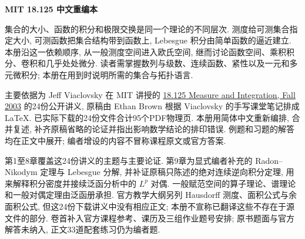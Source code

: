 \frontmatter
\begin{center}
{\color{structurecolor}\bfseries\fontsize{18}{25}\selectfont\BookTitle\par}
{\bfseries MIT 18.125 中文重编本\par}
\BookAuthor\par
\BookDate\par
\end{center}
\originalpreface
集合的大小、函数的积分和极限交换是同一个理论的不同层次. 测度给可测集合指定大小, 可测函数把集合结构带到函数上, Lebesgue 积分由简单函数的逼近建立. 本册沿这一依赖顺序, 从一般测度空间进入欧氏空间, 继而讨论函数空间、乘积积分、卷积和几乎处处微分. 读者需掌握数列与级数、连续函数、紧性以及一元和多元微积分; 本册在用到时说明所需的集合与拓扑语言.

主要依据为 Jeff Viaclovsky 在 MIT 讲授的 \href{https://ocw.mit.edu/courses/18-125-measure-and-integration-fall-2003/pages/lecture-notes/}{18.125 Measure and Integration, Fall 2003} 的24份公开讲义, 原稿由 Ethan Brown 根据 Viaclovsky 的手写课堂笔记排成 LaTeX. 已实际下载的24份文件合计95个PDF物理页. 本册用简体中文重新编排, 合并复述, 补齐原稿省略的论证并指出影响数学结论的排印错误. 例题和习题的解答均在正文中展开; 编者增设的内容不冒称课程原文或官方答案.

第1至8章覆盖这24份讲义的主题与主要论证. 第9章为显式编者补充的 Radon--Nikodym 定理与 Lebesgue 分解, 并补证原稿只陈述的绝对连续逆向积分定理, 用来解释积分密度并接续泛函分析中的 $L^p$ 对偶. 一般赋范空间的算子理论、谱理论和一般对偶定理由泛函册承担. 官方教学大纲另列 Hausdorff 测度、面积公式与余面积公式, 但这24份下载讲义中没有相应正文; 本册不宣称已翻译这些不存在于源文件的部分. 卷首补入官方课程参考、课历及三组作业题号安排; 原书题面与官方解答未纳入, 正文33道配套练习仍为编者题.

